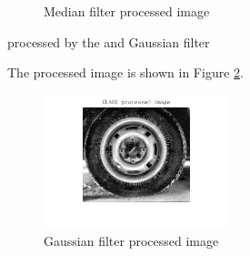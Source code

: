 \begin{figure}[htbp]
    \caption{Median filter processed image}
\label{fig:p3a}
\end{figure}

processed by the and Gaussian filter






The processed image is shown in Figure \ref{fig:p3b}.






\begin{figure}[htbp]
    \centering
	\includegraphics[width=0.48\textwidth]{../images/p1/p1c_image.jpg}
    \caption{Gaussian filter processed image}
\label{fig:p3b}
\end{figure}